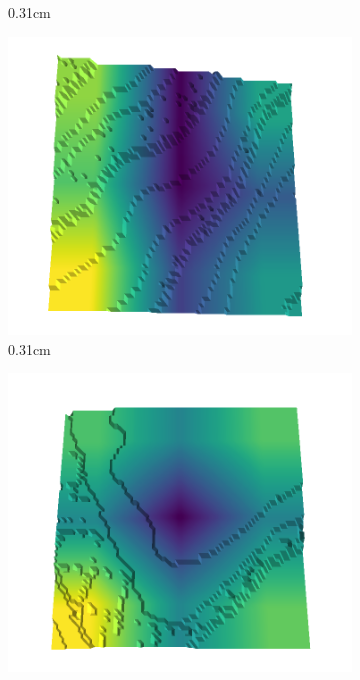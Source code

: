 \documentclass[../document.tex]{subfiles}
\begin{document}
\begin{figure}[H]
\begin{subfigure}[b]{0.242\linewidth}
    \caption{0.31cm}
    \end{subfigure}
    \begin{subfigure}[b]{0.242\linewidth}
    \includegraphics[width=\linewidth]{../img/5/quarry/best/40-patch-3d-majavi-colormap-20.png}
    \caption{0.31cm}
    \end{subfigure}
    \begin{subfigure}[b]{0.242\linewidth}
    \includegraphics[width=\linewidth]{../img/5/quarry/best/44-patch-3d-majavi-colormap-25.png}

\end{subfigure}
\end{figure}
\end{document}
